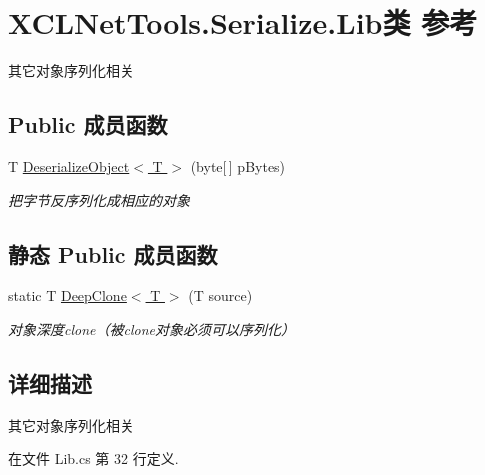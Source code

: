 \hypertarget{class_x_c_l_net_tools_1_1_serialize_1_1_lib}{\section{X\-C\-L\-Net\-Tools.\-Serialize.\-Lib类 参考}
\label{class_x_c_l_net_tools_1_1_serialize_1_1_lib}
}


其它对象序列化相关  


\subsection*{Public 成员函数}
\begin{DoxyCompactItemize}
\item 
T \hyperlink{class_x_c_l_net_tools_1_1_serialize_1_1_lib_ae2d400cea76a1f11f5141deab7c6d2b1}{Deserialize\-Object$<$ T $>$} (byte\mbox{[}$\,$\mbox{]} p\-Bytes)
\begin{DoxyCompactList}\small\item\em 把字节反序列化成相应的对象 \end{DoxyCompactList}\end{DoxyCompactItemize}
\subsection*{静态 Public 成员函数}
\begin{DoxyCompactItemize}
\item 
static T \hyperlink{class_x_c_l_net_tools_1_1_serialize_1_1_lib_ad38f60aaa57643027af6ebc86ef7fe18}{Deep\-Clone$<$ T $>$} (T source)
\begin{DoxyCompactList}\small\item\em 对象深度clone（被clone对象必须可以序列化） \end{DoxyCompactList}\end{DoxyCompactItemize}


\subsection{详细描述}
其它对象序列化相关 



在文件 Lib.\-cs 第 32 行定义.



